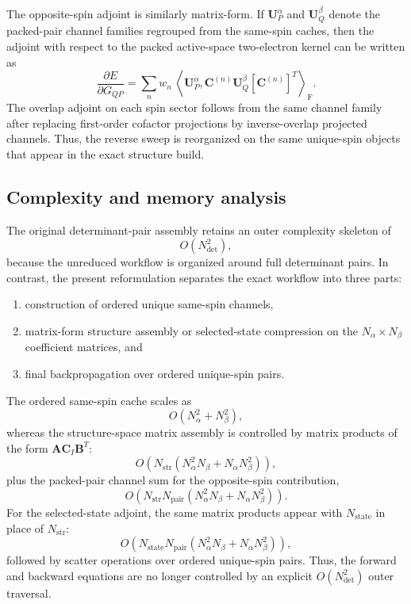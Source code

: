 \documentclass[journal=jctcce,manuscript=article]{achemso}
\newcommand{\Frob}[2]{\left\langle #1, #2 \right\rangle_{\mathrm F}}
\newcommand{\na}{N_{\alpha}}
\newcommand{\nb}{N_{\beta}}
\newcommand{\ndet}{N_{\mathrm{det}}}
\newcommand{\nstr}{N_{\mathrm{str}}}
\newcommand{\nstate}{N_{\mathrm{state}}}
\newcommand{\npair}{N_{\mathrm{pair}}}
\newcommand{\Cmat}{\mathbf{C}}
\newcommand{\wstate}{w_n}
\begin{document}
The opposite-spin adjoint is similarly matrix-form. If
$\mathbf{U}^{\alpha}_{P}$ and $\mathbf{U}^{\beta}_{Q}$ denote the packed-pair
channel families regrouped from the same-spin caches, then the adjoint with
respect to the packed active-space two-electron kernel can be written as
\begin{equation}
\frac{\partial E}{\partial G_{QP}}
=
\sum_n \wstate\,
\Frob{
\mathbf{U}^{\alpha}_{P}
}{
\Cmat^{(n)} \mathbf{U}^{\beta}_{Q} [\Cmat^{(n)}]^{T}
}.
\label{eq:opposite-spin-adjoint}
\end{equation}
The overlap adjoint on each spin sector follows from the same channel family
after replacing first-order cofactor projections by inverse-overlap projected
channels. Thus, the reverse sweep is reorganized on the same unique-spin
objects that appear in the exact structure build.

\subsection{Complexity and memory analysis}
The original determinant-pair assembly retains an outer complexity skeleton
of
\begin{equation}
O(\ndet^2),
\label{eq:old-scaling}
\end{equation}
because the unreduced workflow is organized around full determinant pairs. In
contrast, the present reformulation separates the exact workflow into three
parts:
\begin{enumerate}
  \item construction of ordered unique same-spin channels,
  \item matrix-form structure assembly or selected-state compression on the
        $\na \times \nb$ coefficient matrices, and
  \item final backpropagation over ordered unique-spin pairs.
\end{enumerate}

The ordered same-spin cache scales as
\begin{equation}
O(\na^2 + \nb^2),
\label{eq:cache-scaling}
\end{equation}
whereas the structure-space matrix assembly is controlled by matrix products of
the form $\mathbf{A}\Cmat_I\mathbf{B}^{T}$:
\begin{equation}
O\!\left(
\nstr \left( \na^2 \nb + \na \nb^2 \right)
\right),
\label{eq:forward-scaling}
\end{equation}
plus the packed-pair channel sum for the opposite-spin contribution,
\begin{equation}
O\!\left(
\nstr \npair \left( \na^2 \nb + \na \nb^2 \right)
\right).
\label{eq:forward-op-scaling}
\end{equation}
For the selected-state adjoint, the same matrix products appear with $\nstate$
in place of $\nstr$:
\begin{equation}
O\!\left(
\nstate \npair \left( \na^2 \nb + \na \nb^2 \right)
\right),
\label{eq:backward-op-scaling}
\end{equation}
followed by scatter operations over ordered unique-spin pairs. Thus, the
forward and backward equations are no longer controlled by an explicit
$O(\ndet^2)$ outer traversal.
\end{document}
